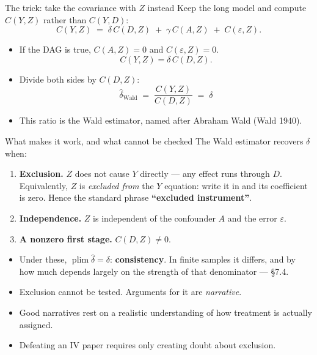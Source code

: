 \documentclass[
  11pt,
  ignorenonframetext,
  aspectratio=169,
]{beamer}
\providecommand{\tightlist}{%
  \setlength{\itemsep}{0pt}\setlength{\parskip}{0pt}}
\begin{document}
\begin{frame}{The trick: take the covariance with \(Z\) instead}
\protect{}\label{the-trick-take-the-covariance-with-z-instead}
Keep the long model and compute \(C(Y,Z)\) rather than \(C(Y,D)\): \[
C(Y,Z) \;=\; \delta\,C(D,Z) \;+\; \gamma\,C(A,Z) \;+\; C(\varepsilon,Z).
\]

\begin{itemize}
\tightlist
\item
  If the DAG is true, \(C(A,Z) = 0\) and \(C(\varepsilon, Z) = 0\). \[
  C(Y,Z) = \delta\,C(D,Z).
  \]
\item
  Divide both sides by \(C(D,Z)\): \[
  \boxed{\;\hat\delta_{\text{Wald}} \;=\; \frac{C(Y,Z)}{C(D,Z)} \;=\; \delta\;}
  \]
\item
  This ratio is the Wald estimator, named after Abraham Wald (Wald
  1940).
\end{itemize}
\end{frame}

\begin{frame}{What makes it work, and what cannot be checked}
\protect{}\label{what-makes-it-work-and-what-cannot-be-checked}
The Wald estimator recovers \(\delta\) when:

\begin{enumerate}
\tightlist
\item
  \textbf{Exclusion.} \(Z\) does not cause \(Y\) directly --- any effect
  runs through \(D\). Equivalently, \(Z\) is \emph{excluded from} the
  \(Y\) equation: write it in and its coefficient is zero. Hence the
  standard phrase \textbf{``excluded instrument''}.
\item
  \textbf{Independence.} \(Z\) is independent of the confounder \(A\)
  and the error \(\varepsilon\).
\item
  \textbf{A nonzero first stage.} \(C(D,Z) \neq 0\).
\end{enumerate}

\vspace{0.4em}

\begin{itemize}
\tightlist
\item
  Under these, \(\operatorname{plim} \hat\delta = \delta\):
  \textbf{consistency}. In finite samples it differs, and by how much
  depends largely on the strength of that denominator --- §7.4.
\item
  Exclusion cannot be tested. Arguments for it are \emph{narrative}.
\item
  Good narratives rest on a realistic understanding of how treatment is
  actually assigned.
\item
  Defeating an IV paper requires only creating doubt about exclusion.
\end{itemize}
\end{frame}
\end{document}

